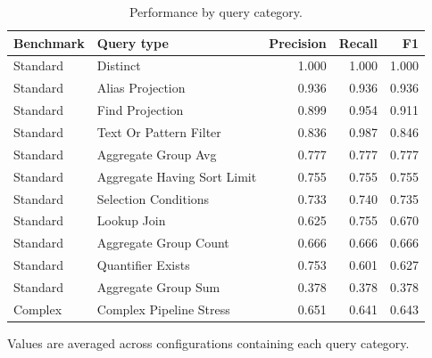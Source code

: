 \begin{table}[htbp]
\centering
\small
\caption{Performance by query category.}
\label{tab:query-category-performance}
\begin{tabular}{llrrr}
\toprule
Benchmark & Query type & Precision & Recall & F1 \\
\midrule
Standard & Distinct & 1.000 & 1.000 & 1.000 \\
Standard & Alias Projection & 0.936 & 0.936 & 0.936 \\
Standard & Find Projection & 0.899 & 0.954 & 0.911 \\
Standard & Text Or Pattern Filter & 0.836 & 0.987 & 0.846 \\
Standard & Aggregate Group Avg & 0.777 & 0.777 & 0.777 \\
Standard & Aggregate Having Sort Limit & 0.755 & 0.755 & 0.755 \\
Standard & Selection Conditions & 0.733 & 0.740 & 0.735 \\
Standard & Lookup Join & 0.625 & 0.755 & 0.670 \\
Standard & Aggregate Group Count & 0.666 & 0.666 & 0.666 \\
Standard & Quantifier Exists & 0.753 & 0.601 & 0.627 \\
Standard & Aggregate Group Sum & 0.378 & 0.378 & 0.378 \\
Complex & Complex Pipeline Stress & 0.651 & 0.641 & 0.643 \\
\bottomrule
\end{tabular}
\par\footnotesize{Values are averaged across configurations containing each query category.}
\end{table}
